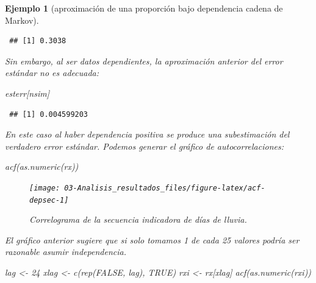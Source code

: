 \documentclass[
]{book}
\newenvironment{Shaded}{\begin{snugshade}}{\end{snugshade}}
\newcommand{\ConstantTok}[1]{\textcolor[rgb]{0.00,0.00,0.00}{#1}}
\newcommand{\DecValTok}[1]{\textcolor[rgb]{0.00,0.00,0.81}{#1}}
\newcommand{\FunctionTok}[1]{\textcolor[rgb]{0.00,0.00,0.00}{#1}}
\newcommand{\NormalTok}[1]{#1}
\newcommand{\OtherTok}[1]{\textcolor[rgb]{0.56,0.35,0.01}{#1}}
\theoremstyle{break}
\newtheorem{example}{Ejemplo}[chapter]
\theoremstyle{nonumberplain}
\begin{document}
\begin{example}[aproximación de una proporción bajo dependencia cadena de Markov]
\begin{verbatim}
 ## [1] 0.3038
\end{verbatim}

Sin embargo, al ser datos dependientes, la aproximación anterior del error estándar no es adecuada:

\begin{Shaded}
\begin{Highlighting}[]
\NormalTok{esterr[nsim]}
\end{Highlighting}
\end{Shaded}

\begin{verbatim}
 ## [1] 0.004599203
\end{verbatim}

En este caso al haber dependencia positiva se produce una subestimación del verdadero error estándar.
Podemos generar el gráfico de autocorrelaciones:

\begin{Shaded}
\begin{Highlighting}[]
\FunctionTok{acf}\NormalTok{(}\FunctionTok{as.numeric}\NormalTok{(rx))}
\end{Highlighting}
\end{Shaded}

\begin{figure}[!htb]

{\centering \texttt{[image: 03-Analisis\_resultados\_files/figure-latex/acf-depsec-1]} 

}

\caption{Correlograma de la secuencia indicadora de días de lluvia.}\label{fig:acf-depsec}
\end{figure}

El gráfico anterior sugiere que si solo tomamos 1 de cada 25 valores podría ser razonable asumir independencia.

\begin{Shaded}
\begin{Highlighting}[]
\NormalTok{lag }\OtherTok{\textless{}{-}} \DecValTok{24}
\NormalTok{xlag }\OtherTok{\textless{}{-}} \FunctionTok{c}\NormalTok{(}\FunctionTok{rep}\NormalTok{(}\ConstantTok{FALSE}\NormalTok{, lag), }\ConstantTok{TRUE}\NormalTok{)}
\NormalTok{rxi }\OtherTok{\textless{}{-}}\NormalTok{ rx[xlag]}
\FunctionTok{acf}\NormalTok{(}\FunctionTok{as.numeric}\NormalTok{(rxi))}
\end{Highlighting}
\end{Shaded}

\begin{figure}[!htb]


\end{figure}
\end{example}
\end{document}
